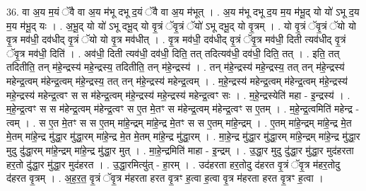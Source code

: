 \documentclass[17pt]{extarticle}
\begin{document}
36. वा अ॒य म॒यं ॅवै वा अ॒य म॑भू दभू द॒यं ॅवै वा अ॒य म॑भूत् । . अ॒य म॑भू दभू द॒य म॒य म॑भू॒द् यो यो॑ ऽभू द॒य म॒य म॑भू॒द् यः । . अ॒भू॒द् यो यो॑ ऽभू दभू॒द् यो वृ॒त्रं ॅवृ॒त्रं ॅयो॑ ऽभू दभू॒द् यो वृ॒त्रम् । . यो वृ॒त्रं ॅवृ॒त्रं ॅयो यो वृ॒त्र मव॑धी॒ दव॑धीद् वृ॒त्रं ॅयो यो वृ॒त्र मव॑धीत् । . वृ॒त्र मव॑धी॒ दव॑धीद् वृ॒त्रं ॅवृ॒त्र मव॑धी॒ दिती त्यव॑धीद् वृ॒त्रं ॅवृ॒त्र मव॑धी॒ दिति॑ । . अव॑धी॒ दिती त्यव॑धी॒ दव॑धी॒ दिति॒ तत् तदित्यव॑धी॒ दव॑धी॒ दिति॒ तत् । . इति॒ तत् तदितीति॒ तन् म॑हे॒न्द्रस्य॑ महे॒न्द्रस्य॒ तदितीति॒ तन् म॑हे॒न्द्रस्य॑ । . तन् म॑हे॒न्द्रस्य॑ महे॒न्द्रस्य॒ तत् तन् म॑हे॒न्द्रस्य॑ महेन्द्र॒त्वम् म॑हेन्द्र॒त्वम् म॑हे॒न्द्रस्य॒ तत् तन् म॑हे॒न्द्रस्य॑ महेन्द्र॒त्वम् । . म॒हे॒न्द्रस्य॑ महेन्द्र॒त्वम् म॑हेन्द्र॒त्वम् म॑हे॒न्द्रस्य॑ महे॒न्द्रस्य॑ महेन्द्र॒त्वꣳ स स म॑हेन्द्र॒त्वम् म॑हे॒न्द्रस्य॑ महे॒न्द्रस्य॑ महेन्द्र॒त्वꣳ सः । . म॒हे॒न्द्रस्येति॑ महा - इ॒न्द्रस्य॑ । . म॒हे॒न्द्र॒त्वꣳ स स म॑हेन्द्र॒त्वम् म॑हेन्द्र॒त्वꣳ स ए॒त मे॒तꣳ स म॑हेन्द्र॒त्वम् म॑हेन्द्र॒त्वꣳ स ए॒तम् । . म॒हे॒न्द्र॒त्वमिति॑ महेन्द्र - त्वम् । . स ए॒त मे॒तꣳ स स ए॒तम् मा॑हे॒न्द्रम् मा॑हे॒न्द्र मे॒तꣳ स स ए॒तम् मा॑हे॒न्द्रम् । . ए॒तम् मा॑हे॒न्द्रम् मा॑हे॒न्द्र मे॒त मे॒तम् मा॑हे॒न्द्र मु॑द्धा॒र मु॑द्धा॒रम् मा॑हे॒न्द्र मे॒त मे॒तम् मा॑हे॒न्द्र मु॑द्धा॒रम् । . मा॒हे॒न्द्र मु॑द्धा॒र मु॑द्धा॒रम् मा॑हे॒न्द्रम् मा॑हे॒न्द्र मु॑द्धा॒र मुदु दु॑द्धा॒रम् मा॑हे॒न्द्रम् मा॑हे॒न्द्र मु॑द्धा॒र मुत् । . मा॒हे॒न्द्रमिति॑ माहा - इ॒न्द्रम् । . उ॒द्धा॒र मुदु दु॑द्धा॒र मु॑द्धा॒र मुद॑हरता हर॒तो दु॑द्धा॒र मु॑द्धा॒र मुद॑हरत । . उ॒द्धा॒रमित्यु॑त् - हा॒रम् । . उद॑हरता हर॒तोदु द॑हरत वृ॒त्रं ॅवृ॒त्र म॑हर॒तोदु द॑हरत वृ॒त्रम् । . अ॒ह॒र॒त॒ वृ॒त्रं ॅवृ॒त्र म॑हरता हरत वृ॒त्रꣳ ह॒त्वा ह॒त्वा वृ॒त्र म॑हरता हरत वृ॒त्रꣳ ह॒त्वा । \newline
\end{document}
